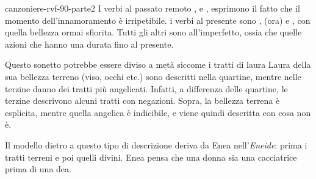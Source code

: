 \documentclass[preview]{standalone}
\begin{document}
\begin{snippet}{canzoniere-rvf-90-parte2}
    I verbi al passato remoto ,  e ,
    esprimono il fatto che il momento dell'innamoramento è irripetibile.
    i verbi al presente sono ,  (ora) e ,
    con quella bellezza ormai sfiorita.
    Tutti gli altri sono all'imperfetto, ossia che quelle azioni che hanno una durata fino al presente.

    Questo sonetto potrebbe essere diviso a metà siccome i tratti di laura Laura
    della sua bellezza terreno (viso, occhi etc.) sono descritti nella quartine,
    mentre nelle terzine danno dei tratti più angelicati.
    Infatti, a differenza delle quartine, le terzine descrivono alcuni tratti con
    negazioni. Sopra, la bellezza terrena è esplicita, mentre quella angelica è indicibile,
    e viene quindi descritta con cosa non è.

    Il modello dietro a questo tipo di descrizione deriva da Enea nell'\textit{Eneide}:
    prima i tratti terreni e poi quelli divini. Enea pensa che una donna sia una cacciatrice
    prima di una dea.


\end{snippet}
\end{document}
